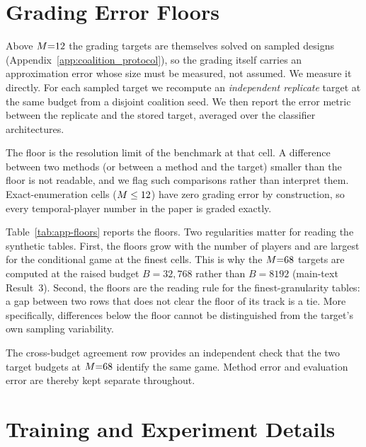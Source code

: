 

\section{Grading Error Floors}
\label{app:noise_floors}

Above $M{=}12$ the grading targets are themselves solved on sampled
designs (Appendix~\ref{app:coalition_protocol}), so the grading itself
carries an approximation error whose size must be measured, not assumed.  We measure it directly.  For each
sampled target we recompute an \emph{independent replicate} target at the
same budget from a disjoint coalition seed.  We then report the error metric
between the replicate and the stored target, averaged over the classifier
architectures.

The floor is the resolution limit of the benchmark at that cell.  A
difference between two methods (or between a method and the target) smaller
than the floor is not readable, and we flag such comparisons rather than
interpret them.  Exact-enumeration cells ($M \leq 12$) have zero grading
error by construction, so every temporal-player number in the paper is
graded exactly.



Table~\ref{tab:app-floors} reports the floors.  Two regularities matter for
reading the synthetic tables.  First, the floors grow with the number of
players and are largest for the conditional game at the finest cells.  This
is why the $M{=}68$ targets are computed at the raised budget
$B{=}32{,}768$ rather than $B{=}8192$ (main-text Result~3).  Second, the
floors are the reading rule for the finest-granularity tables: a gap between
two rows that does not clear the floor of its track is a tie. More specifically, differences below the floor cannot be distinguished from the target's own sampling variability.

The cross-budget agreement row provides an independent check that the two target budgets at
$M{=}68$ identify the same game.  Method error and evaluation error are thereby kept separate throughout.

\section{Training and Experiment Details}
\label{app:experiment_details}

